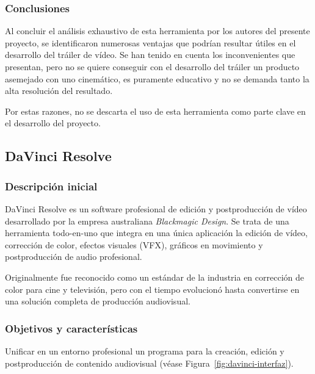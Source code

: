 \subsubsection{Conclusiones}

Al concluir el análisis exhaustivo de esta herramienta por los autores del presente proyecto, se 
identificaron numerosas ventajas que podrían resultar útiles en el desarrollo del tráiler de vídeo. 
Se han tenido en cuenta los inconvenientes que presentan, pero no se quiere conseguir con el desarrollo 
del tráiler un producto asemejado con uno cinemático, es puramente educativo y no se demanda tanto 
la alta resolución del resultado.

Por estas razones, no se descarta el uso de esta herramienta como parte clave en el desarrollo del proyecto.

\subsection{DaVinci Resolve}
\label{subsec:davinci-resolve}

\subsubsection{Descripción inicial}

DaVinci Resolve es un software profesional de edición y postproducción de vídeo desarrollado por la empresa australiana \textit{Blackmagic Design}. Se trata de una herramienta todo-en-uno que integra en una única aplicación la edición de vídeo, corrección de color, efectos visuales (VFX), gráficos en movimiento y postproducción de audio profesional.

Originalmente fue reconocido como un estándar de la industria en corrección de color para cine y televisión, pero con el tiempo evolucionó hasta convertirse en una solución completa de producción audiovisual.

\subsubsection{Objetivos y características}


Unificar en un entorno profesional un programa para la creación, edición y postproducción de contenido audiovisual (véase Figura~\ref{fig:davinci-interfaz}).



